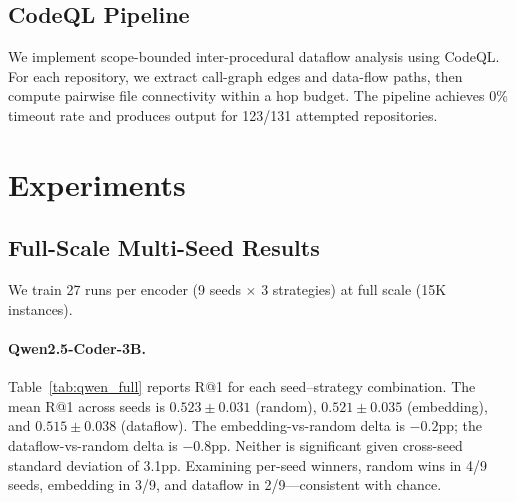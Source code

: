 \documentclass[11pt,a4paper]{article}
\begin{document}
\subsection{CodeQL Pipeline}

We implement scope-bounded inter-procedural dataflow analysis using CodeQL.
For each repository, we extract call-graph edges and data-flow paths, then compute pairwise file connectivity within a hop budget.
The pipeline achieves 0\% timeout rate and produces output for 123/131 attempted repositories.


\section{Experiments}
\label{sec:experiments}

\subsection{Full-Scale Multi-Seed Results}
\label{sec:fullscale}

We train 27 runs per encoder (9 seeds $\times$ 3 strategies) at full scale (15K instances).

\paragraph{Qwen2.5-Coder-3B.}
Table~\ref{tab:qwen_full} reports R@1 for each seed--strategy combination.
The mean R@1 across seeds is $0.523 \pm 0.031$ (random), $0.521 \pm 0.035$ (embedding), and $0.515 \pm 0.038$ (dataflow).
The embedding-vs-random delta is $-0.2$pp; the dataflow-vs-random delta is $-0.8$pp.
Neither is significant given cross-seed standard deviation of 3.1pp.
Examining per-seed winners, random wins in 4/9 seeds, embedding in 3/9, and dataflow in 2/9---consistent with chance.
\end{document}

